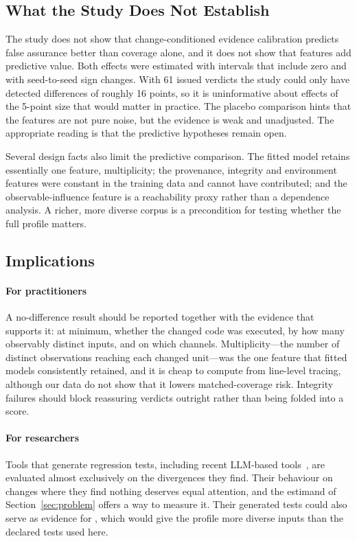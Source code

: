 \subsection{What the Study Does Not Establish}
The study does not show that change-conditioned evidence calibration predicts false assurance better than coverage alone, and it does not show that \ers{} features add predictive value. Both effects were estimated with intervals that include zero and with seed-to-seed sign changes. With 61 issued verdicts the study could only have detected differences of roughly 16 points, so it is uninformative about effects of the 5-point size that would matter in practice. The placebo comparison hints that the \ers{} features are not pure noise, but the evidence is weak and unadjusted. The appropriate reading is that the predictive hypotheses remain open.

Several design facts also limit the predictive comparison. The fitted model retains essentially one feature, multiplicity; the provenance, integrity and environment features were constant in the training data and cannot have contributed; and the observable-influence feature is a reachability proxy rather than a dependence analysis. A richer, more diverse corpus is a precondition for testing whether the full profile matters.

\subsection{Implications}
\paragraph*{For practitioners} A no-difference result should be reported together with the evidence that supports it: at minimum, whether the changed code was executed, by how many observably distinct inputs, and on which channels. Multiplicity---the number of distinct observations reaching each changed unit---was the one feature that fitted models consistently retained, and it is cheap to compute from line-level tracing, although our data do not show that it lowers matched-coverage risk. Integrity failures should block reassuring verdicts outright rather than being folded into a score.

\paragraph*{For researchers} Tools that generate regression tests, including recent LLM-based tools~\cite{pradel2026testora,hu2026difftestgen,ayub2026semadiff}, are evaluated almost exclusively on the divergences they find. Their behaviour on changes where they find nothing deserves equal attention, and the estimand of Section~\ref{sec:problem} offers a way to measure it. Their generated tests could also serve as evidence for \sbg{}, which would give the profile more diverse inputs than the declared tests used here.

